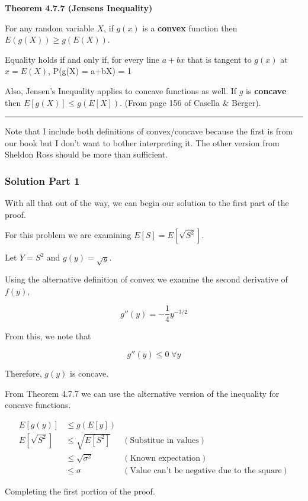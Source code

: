 \noindent\textbf{Theorem 4.7.7 (Jensens Inequality)}

For any random variable $X$, if $g(x)$ is a \textbf{convex} function then $E(g(X)) \geq g(E(X))$.

Equality holds if and only if, for every line $a + bx$ that is tangent to $g(x)$ at $x = E(X)$, P(g(X) = a+bX) = 1

Also, Jensen's Inequality applies to concave functions as well. If $g$ is \textbf{concave} then $E[g(X)] \leq g(E[X])$. (From page 156 of Casella \& Berger). 
\vspace{0.75em}
\hrule
\vspace{0.75em}

Note that I include both definitions of convex/concave because the first is from our book but I don't want to bother interpreting it. The other version from Sheldon Ross should be more than sufficient.

\pagebreak

\subsubsection*{Solution Part 1}

With all that out of the way, we can begin our solution to the first part of the proof. 

For this problem we are examining $E[S] = E[\sqrt{S^2}]$. 

Let $Y=S^2$ and $g(y) = \sqrt{y}$. 

Using the alternative definition of convex we examine the second derivative of $f(y)$, 

\[g''(y) = -\frac{1}{4} y^{-3/2}\]

From this, we note that

\[g''(y) \leq 0 \; \forall y\] 

Therefore, $g(y)$ is concave.

From Theorem 4.7.7 we can use the alternative version of the inequality for concave functions.

\begin{align*}
	E[g(y)] &\leq g(E[y]) \\
	E[\sqrt{S^2}] &\leq \sqrt{E[S^2]} & (\text{Substitue in values}) \\
	&\leq \sqrt{\sigma^2} & (\text{Known expectation}) \\
	&\leq \sigma & (\text{Value can't be negative due to the square})
\end{align*}

Completing the first portion of the proof.


